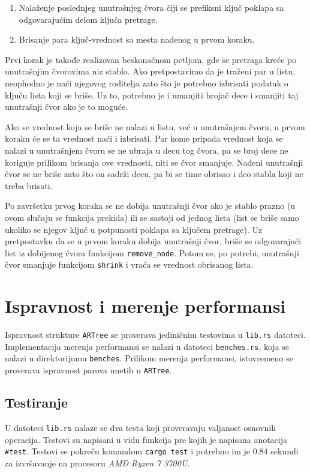 \documentclass[12pt,oneside]{memoir}
\begin{document}
\begin{enumerate}
  \item Nalaženje poslednjeg unutrašnjeg čvora čiji se prefiksni ključ
        poklapa sa odgovarajućim delom ključa pretrage.
  \item Brisanje para ključ-vrednost sa mesta nađenog u prvom koraku.
\end{enumerate}

Prvi korak je takođe realizovan beskonačnom petljom, gde se pretraga
kreće po unutrašnjim čvorovima niz stablo. Ako pretpostavimo da je
traženi par u listu, neophodno je naći njegovog roditelja zato što
je potrebno izbrisati podatak o ključu lista koji se briše.
Uz to, potrebno je i umanjiti brojač dece i smanjiti taj
unutrašnji čvor ako je to moguće.

Ako se vrednost koja se briše
ne nalazi u listu, već u unutrašnjem čvoru, u prvom koraku
će se ta vrednost naći i izbrisati.
Par kome pripada vrednost koja se nalazi u unutrašnjem čvoru
se ne ubraja u decu tog čvora,
pa se broj dece ne koriguje prilikom brisanja ove vrednosti, niti
se čvor smanjuje.
Nađeni unutrašnji čvor se ne briše zato što on sadrži
decu, pa bi se time obrisao i deo stabla koji ne treba
brisati.

Po završetku prvog koraka se ne dobija unutrašnji čvor ako je
stablo prazno (u ovom slučaju se funkcija prekida) ili se
sastoji od jednog lista (list se briše samo ukoliko se njegov ključ
u potpunosti poklapa sa ključem pretrage). Uz pretpostavku da se u prvom
koraku dobija unutrašnji čvor, briše se odgovarajući list iz dobijenog
čvora funkcijom \texttt{remove\_node}. Potom se, po potrebi,
unutrašnji čvor smanjuje funkcijom \texttt{shrink}
i vraća se vrednost obrisanog lista.

\section{Ispravnost i merenje performansi}
Ispravnost strukture \texttt{ARTree} se
proverava jediničnim testovima u \texttt{lib.rs} datoteci.
Implementacija merenja performansi se nalazi u
datoteci \texttt{benches.rs}, koja se nalazi u
direktorijumu \texttt{benches}.
Prilikom merenja performansi, istovremeno se proverava
ispravnost parova unetih u \texttt{ARTree}.

\subsection{Testiranje}
U datoteci \texttt{lib.rs} nalaze se dva testa koji proveravaju
valjanost osnovnih operacija. Testovi su napisani u vidu funkcija
pre kojih je napisana anotacija \texttt{\#\lbrack test\rbrack}.
Testovi se pokreču komandom \texttt{cargo test} i potrebno
im je $0.84$ sekundi za izvršavanje na procesoru
\textit{AMD Ryzen 7 3700U}.
\end{document}

